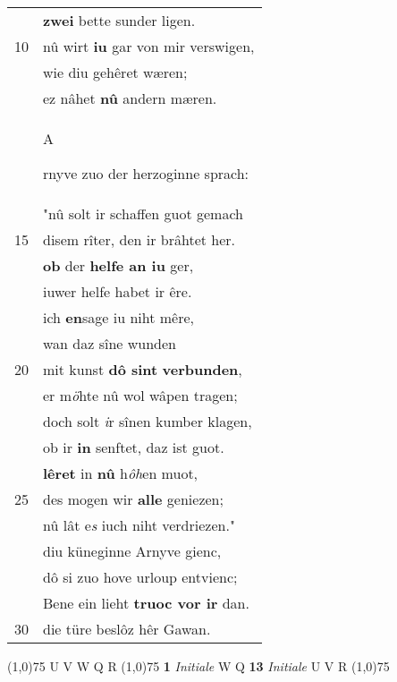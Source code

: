 \documentclass[8pt,a4paper,notitlepage]{article}
\begin{document}
\begin{table}[ht]
\begin{minipage}[t]{0.5\linewidth}
\begin{tabular}{rl}
 & \textbf{zwei} bette sunder ligen.\\ 
10 & nû wirt \textbf{iu} gar von mir verswigen,\\ 
 & wie diu gehêret wæren;\\ 
 & ez nâhet \textbf{nû} andern mæren.\\ 
 & \begin{large}A\end{large}rnyve zuo der herzoginne sprach:\\ 
 & "nû solt ir schaffen guot gemach\\ 
15 & disem rîter, den ir brâhtet her.\\ 
 & \textbf{ob} der \textbf{helfe an iu} ger,\\ 
 & iuwer helfe habet ir êre.\\ 
 & ich \textbf{en}sage iu niht mêre,\\ 
 & wan daz sîne wunden\\ 
20 & mit kunst \textbf{dô sint} \textbf{verbunden},\\ 
 & er m\textit{ö}hte nû wol wâpen tragen;\\ 
 & doch solt \textit{i}r sînen kumber klagen,\\ 
 & ob ir \textbf{in} senftet, daz ist guot.\\ 
 & \textbf{lêret} in \textbf{nû} h\textit{ôh}en muot,\\ 
25 & des mogen wir \textbf{alle} geniezen;\\ 
 & nû lât e\textit{s} iuch niht verdriezen."\\ 
 & diu küneginne Arnyve gienc,\\ 
 & dô si zuo hove urloup entvienc;\\ 
 & Bene ein lieht \textbf{truoc vor ir} dan.\\ 
30 & die türe beslôz hêr Gawan.\\ 
\end{tabular}
\scriptsize
\line(1,0){75} \newline
U V W Q R \newline
\line(1,0){75} \newline
\textbf{1} \textit{Initiale} W Q  \textbf{13} \textit{Initiale} U V R  \newline
\line(1,0){75} \newline

\end{minipage}
\end{table}
\end{document}
